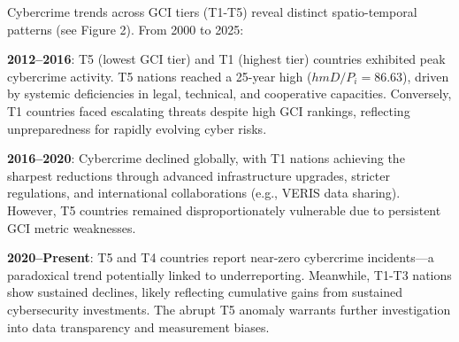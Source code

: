 	Cybercrime trends across GCI tiers (T1-T5) reveal distinct spatio-temporal patterns (see Figure 2).
	From 2000 to 2025:

	\textbf{2012–2016}: T5 (lowest GCI tier) and T1 (highest tier) countries exhibited peak cybercrime activity.
	T5 nations reached a 25-year high ($hmD/P_i = 86.63$), driven by systemic deficiencies in legal, technical, and cooperative capacities.
	Conversely, T1 countries faced escalating threats despite high GCI rankings, reflecting unpreparedness for rapidly evolving cyber risks.

	\textbf{2016–2020}: Cybercrime declined globally,
	with T1 nations achieving the sharpest reductions through advanced infrastructure upgrades, stricter regulations, and international collaborations (e.g., VERIS data sharing).
	However, T5 countries remained disproportionately vulnerable due to persistent GCI metric weaknesses.

	\textbf{2020–Present}: T5 and T4 countries report near-zero cybercrime incidents—a paradoxical trend potentially linked to underreporting.
	Meanwhile, T1-T3 nations show sustained declines, likely reflecting cumulative gains from sustained cybersecurity investments.
	The abrupt T5 anomaly warrants further investigation into data transparency and measurement biases.